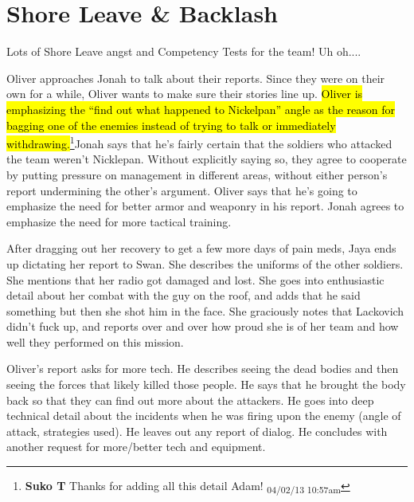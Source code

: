 \setcounter{chapter}{ 16 }
\chapter{\textbf{Shore Leave \& Backlash} }








Lots of Shore Leave angst and Competency Tests for the team!  Uh oh....





Oliver approaches Jonah to talk about their reports.  Since they were on their own for a while, Oliver wants to make sure their stories line up.  \hl{Oliver is emphasizing the ``find out what happened to Nickelpan'' angle as the reason for bagging one of the enemies instead of trying to talk or immediately withdrawing.}\footnote{\textbf{Suko T }Thanks for adding all this detail Adam! \textsubscript{04/02/13 10:57am}}Jonah says that he's fairly certain that the soldiers who attacked the team weren't Nicklepan.  Without explicitly saying so, they agree to cooperate by putting pressure on management in different areas, without either person's report undermining the other's argument.  Oliver says that he's going to emphasize the need for better armor and weaponry in his report.  Jonah agrees to emphasize the need for more tactical training.



After dragging out her recovery to get a few more days of pain meds, Jaya ends up dictating her report to Swan.  She describes the uniforms of the other soldiers.  She mentions that her radio got damaged and lost.  She goes into enthusiastic detail about her combat with the guy on the roof, and adds that he said something but then she shot him in the face.  She graciously notes that Lackovich didn't fuck up, and reports over and over how proud she is of her team and how well they performed on this mission.



Oliver's report asks for more tech.  He describes seeing the dead bodies and then seeing the forces that likely killed those people.  He says that he brought the body back so that they can find out more about the attackers.  He goes into deep technical detail about the incidents when he was firing upon the enemy (angle of attack, strategies used).  He leaves out any report of dialog. He concludes with another request for more/better tech and equipment.




